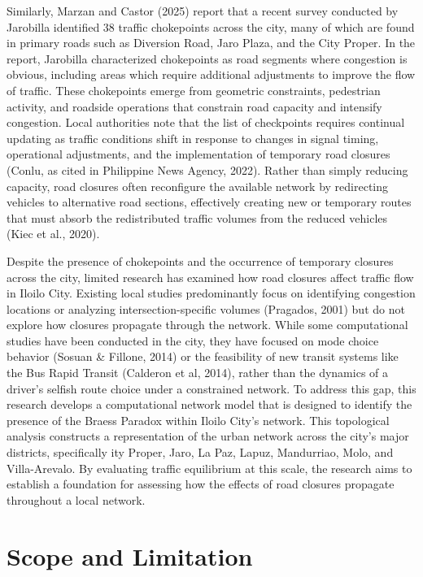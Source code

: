 Similarly, Marzan and Castor (2025) report that a recent survey conducted by Jarobilla identified 38 traffic chokepoints across the city, many of which are found in primary roads such as Diversion Road, Jaro Plaza, and the City Proper. In the report, Jarobilla characterized chokepoints as road segments where congestion is obvious, including areas which require additional adjustments to improve the flow of traffic. These chokepoints emerge from geometric constraints, pedestrian activity, and roadside operations that constrain road capacity and intensify congestion. Local authorities note that the list of checkpoints requires continual updating as traffic conditions shift in response to changes in signal timing, operational adjustments, and the implementation of temporary road closures (Conlu, as cited in Philippine News Agency, 2022). Rather than simply reducing capacity, road closures often reconfigure the available network by redirecting vehicles to alternative road sections, effectively creating new or temporary routes that must absorb the redistributed traffic volumes from the reduced vehicles (Kiec et al., 2020).  

Despite the presence of chokepoints and the occurrence of temporary closures across the city, limited research has examined how road closures affect traffic flow in Iloilo City. Existing local studies predominantly focus on identifying congestion locations or analyzing intersection-specific volumes (Pragados, 2001) but do not explore how closures propagate through the network. While some computational studies have been conducted in the city, they have focused on mode choice behavior (Sosuan \& Fillone, 2014) or the feasibility of new transit systems like the Bus Rapid Transit (Calderon et al, 2014), rather than the dynamics of a driver's selfish route choice under a constrained network.  To address this gap, this research develops a computational network model that is designed to identify the presence of the Braess Paradox within Iloilo City's network. This topological analysis constructs a representation of the urban network across the city's major districts, specifically ity Proper, Jaro, La Paz, Lapuz, Mandurriao, Molo, and Villa-Arevalo. By evaluating traffic equilibrium at this scale, the research aims to establish a foundation for assessing how the effects of road closures propagate throughout a local network.

\section{Scope and Limitation}
\label{sec:scope_limitation}

